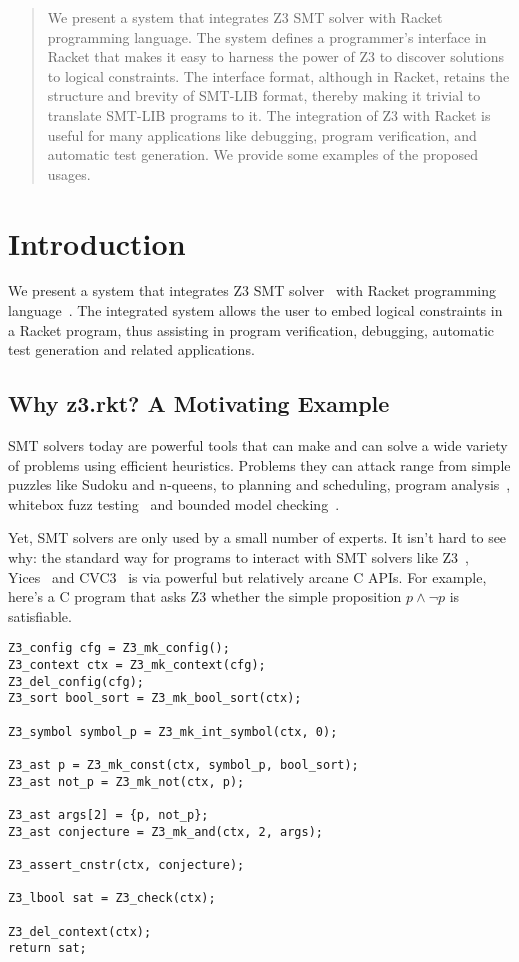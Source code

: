 \begin{abstract}
 We present a system that integrates Z3 SMT solver with
 Racket programming language. The system defines a programmer's
 interface in Racket that makes it easy to harness the power
 of Z3 to discover solutions to logical constraints. The
 interface format, although in Racket, retains the structure
 and brevity of SMT-LIB format, thereby making it trivial to
 translate SMT-LIB programs to it. The integration of Z3
 with Racket is useful for many applications like debugging,
 program verification, and automatic test generation. We
 provide some examples of the proposed usages.
\end{abstract}
\section{Introduction}
We present a system that integrates Z3 SMT solver~\cite{z3} with
Racket programming language~\cite{racket}. The integrated
system allows the user to embed logical constraints in a
Racket program, thus assisting in program verification,
debugging, automatic test generation and related
applications.

\subsection{Why z3.rkt? A Motivating Example}
\label{sec:motiv}

SMT solvers today are powerful tools that can make and can solve a wide variety
of problems using efficient heuristics. Problems they can attack range from
simple puzzles like Sudoku and n-queens, to planning and scheduling, program
analysis~\cite{Gulwani:08}, whitebox fuzz testing~\cite{Godefroid:08} and
bounded model checking~\cite{Armando:09}.

Yet, SMT solvers are only used by a small number of experts. It isn't hard to
see why: the standard way for programs to interact with SMT solvers like
Z3~\cite{z3}, Yices~\cite{yices} and CVC3~\cite{cvc3} is via powerful but
relatively arcane C APIs. For example, here's a C program that asks Z3 whether
the simple proposition $p \wedge \neg p$ is satisfiable.

\begin{verbatim}
Z3_config cfg = Z3_mk_config();
Z3_context ctx = Z3_mk_context(cfg);
Z3_del_config(cfg);
Z3_sort bool_sort = Z3_mk_bool_sort(ctx);

Z3_symbol symbol_p = Z3_mk_int_symbol(ctx, 0);

Z3_ast p = Z3_mk_const(ctx, symbol_p, bool_sort);
Z3_ast not_p = Z3_mk_not(ctx, p);

Z3_ast args[2] = {p, not_p};
Z3_ast conjecture = Z3_mk_and(ctx, 2, args);

Z3_assert_cnstr(ctx, conjecture);

Z3_lbool sat = Z3_check(ctx);

Z3_del_context(ctx);
return sat;
\end{verbatim}

